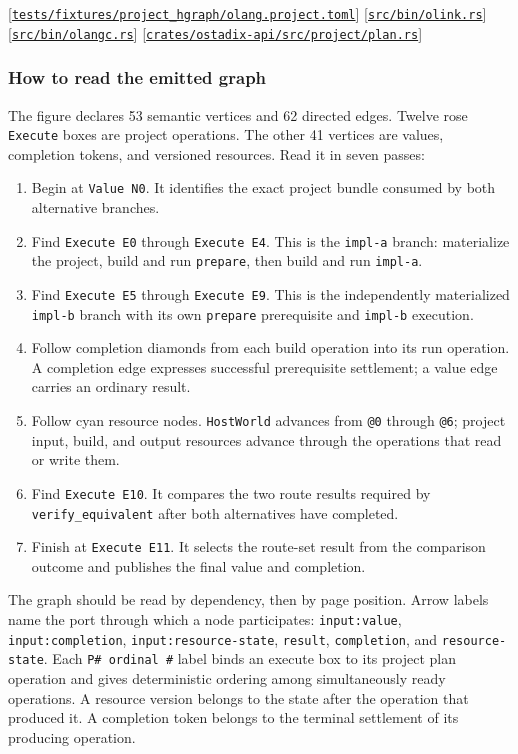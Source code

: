 \documentclass[11pt,oneside]{article}
\newcommand{\src}[1]{\textcolor{OSlate}{\scriptsize[\href{https://github.com/lostadi/OSTADIX/blob/c0b02c326b2329a95ba52447c7180bc93957cd57/#1}{\nolinkurl{#1}}]}\allowbreak}
\begin{document}
\src{tests/fixtures/project_hgraph/olang.project.toml}
\src{src/bin/olink.rs}
\src{src/bin/olangc.rs}
\src{crates/ostadix-api/src/project/plan.rs}

\subsubsection*{How to read the emitted graph}

The figure declares 53 semantic vertices and 62 directed edges. Twelve rose
\texttt{Execute} boxes are project operations. The other 41 vertices are
values, completion tokens, and versioned resources. Read it in seven passes:

\begin{enumerate}
  \item Begin at \texttt{Value N0}. It identifies the exact project bundle
        consumed by both alternative branches.
  \item Find \texttt{Execute E0} through \texttt{Execute E4}. This is the
        \texttt{impl-a} branch: materialize the project, build and run
        \texttt{prepare}, then build and run \texttt{impl-a}.
  \item Find \texttt{Execute E5} through \texttt{Execute E9}. This is the
        independently materialized \texttt{impl-b} branch with its own
        \texttt{prepare} prerequisite and \texttt{impl-b} execution.
  \item Follow completion diamonds from each build operation into its run
        operation. A completion edge expresses successful prerequisite
        settlement; a value edge carries an ordinary result.
  \item Follow cyan resource nodes. \texttt{HostWorld} advances from
        \texttt{@0} through \texttt{@6}; project input, build, and output
        resources advance through the operations that read or write them.
  \item Find \texttt{Execute E10}. It compares the two route results required
        by \texttt{verify\_equivalent} after both alternatives have completed.
  \item Finish at \texttt{Execute E11}. It selects the route-set result from
        the comparison outcome and publishes the final value and completion.
\end{enumerate}

The graph should be read by dependency, then by page position. Arrow labels
name the port through which a node participates:
\texttt{input:value}, \texttt{input:completion},
\texttt{input:resource-state}, \texttt{result}, \texttt{completion}, and
\texttt{resource-state}. Each \texttt{P\# ordinal \#} label binds an execute
box to its project plan operation and gives deterministic ordering among
simultaneously ready operations. A resource version belongs to the state after
the operation that produced it. A completion token belongs to the terminal
settlement of its producing operation.
\end{document}
